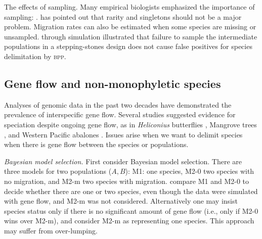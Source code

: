 \documentclass[A4]{article1}
\begin{document}
The effects of sampling.  Many empirical biologists emphasized the importance of
sampling: \citet{Chambers2020, Wells2022}.  \cite{Yang2017} has pointed out that rarity
and singletons should not be a major problem. Migration rates can also be estimated when
some species are missing or unsampled. \citet{Zhang2011} through simulation illustrated
that failure to sample the intermediate populations in a stepping-stones design does not
cause false positives for species delimitation by \textsc{bpp}.


\subsection{Gene flow and non-monophyletic species}

Analyses of genomic data in the past two decades have demonstrated the prevalence of
interspecific gene flow.  Several studies suggested evidence for speciation despite
ongoing gene flow, as in \textit{Heliconius} butterflies \citep{Martin2013}, Mangrove
trees \citep{He2019}, and Western Pacific abalones \citep{Hirase2021}.  Issues arise
when we want to delimit species when there is gene flow between the species or
populations.

\textit{Bayesian model selection.}  First consider Bayesian model selection. There are
three models for two populations ($A,B$): M1: one species, M2-0 two species with no
migration, and M2-m two species with migration.  \citet{Leache2019} compare M1 and M2-0 to
decide whether there are one or two species, even though the data were simulated with gene
flow, and M2-m was not considered.  Alternatively one may insist species status only if
there is no significant amount of gene flow (i.e., only if M2-0 wins over M2-m), and
consider M2-m as representing one species.  This approach may suffer from over-lumping. 
\end{document}
